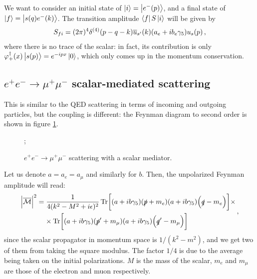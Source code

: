 \documentclass[main.tex]{subfiles}
\begin{document}
We want to consider an initial state of \(\ket{i} = \ket{e^{-}(p)}\), and a final state of \(\ket{f} = \ket{s(q) e^{-}(k)}\). 
The transition amplitude \(\bra{f} S \ket{i}\) will be given by 
%
\begin{align}
S_{fi}
= (2 \pi )^{4} \delta^{(4)} (p - q - k)
\overline{u}_{s'}(k) \qty(a_e + i b_e \gamma_{5}) u_s (p)
\,,
\end{align}
%
where there is no trace of the scalar: in fact, its contribution is only  \(\varphi_{+} ^\dag (x) \ket{s(p)} = e^{-ipx} \ket{0}\), which only comes up in the momentum conservation. 

\subsection{\(e^{+} e^{-} \to \mu^+ \mu^-\) scalar-mediated scattering}

This is similar to the QED scattering in terms of incoming and outgoing particles, but the coupling is different: the Feynman diagram to second order is shown in figure \ref{fig:scalar-mediator-eemumu}.

\begin{figure}[ht]
\centering
{};
\caption{\(e^{+} e^{-} \to \mu^+ \mu^-\) scattering with a scalar mediator.}
\label{fig:scalar-mediator-eemumu}
\end{figure}

Let us denote \(a = a_e = a_\mu \) and similarly for \(b\).
Then, the unpolarized Feynman amplitude will read: 
%
\begin{align}
\begin{split}
\abs{\mathcal{\overline{M}}}^2
&= \frac{1}{4 (k^2- M^2 + i \epsilon)^2 }
\Tr[ (a + i b \gamma_5 ) (\slashed{p} + m_e) \qty(a + i b \gamma_5 ) \qty(\slashed{q} - m_e)] \times \\
&\phantom{=}\ 
\times \Tr[ (a + i b \gamma_5 ) (\slashed{p}' + m_\mu ) \qty(a + i b \gamma_5 ) \qty(\slashed{q}' - m_\mu )]
\end{split}
\,,
\end{align}
%
since the scalar propagator in momentum space is \(1/ (k^2 - m^2)\), and we get two of them from taking the square modulus.
The factor \(1/4\) is due to the average being taken on the initial polarizations. 
\(M\) is the mass of the scalar, \(m_e\) and \(m_\mu\) are those of the electron and muon respectively. 
\end{document}

